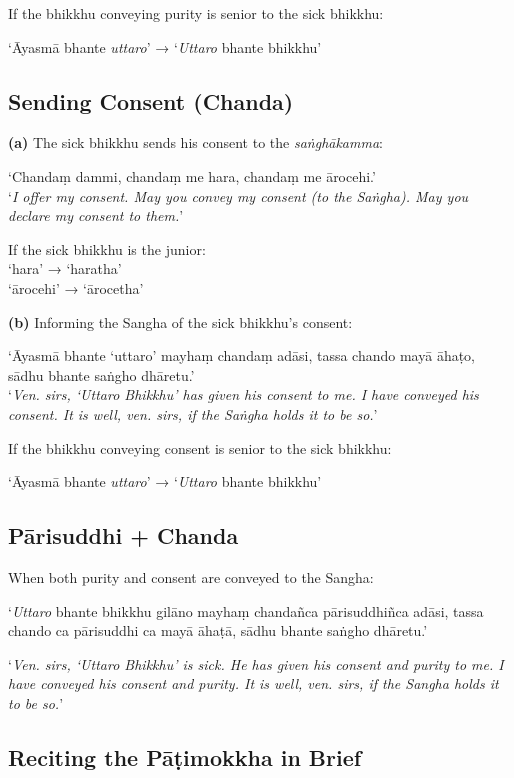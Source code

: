 If the bhikkhu conveying purity is senior to the sick bhikkhu:

‘Āyasmā bhante \emph{uttaro}’ → ‘\emph{Uttaro} bhante bhikkhu’

\subsection{Sending Consent (Chanda)}

\textbf{(a)} The sick bhikkhu sends his consent to the \emph{saṅghākamma}:

‘Chandaṃ dammi, chandaṃ me hara, chandaṃ me ārocehi.’\\
‘\emph{I offer my consent. May you convey my consent (to the Saṅgha). May you
  declare my consent to them.}’

If the sick bhikkhu is the junior:\\
‘hara’ → ‘haratha’\\
‘ārocehi’ → ‘ārocetha’

\textbf{(b)} Informing the Sangha of the sick bhikkhu's consent:

‘Āyasmā bhante ‘uttaro’ mayhaṃ chandaṃ adāsi, tassa chando mayā āhaṭo, sādhu bhante saṅgho dhāretu.’\\
‘\emph{Ven. sirs, ‘Uttaro Bhikkhu’ has given his consent to me. I have conveyed
  his consent. It is well, ven. sirs, if the Saṅgha holds it to be so.}’

If the bhikkhu conveying consent is senior to the sick bhikkhu:

‘Āyasmā bhante \emph{uttaro}’ → ‘\emph{Uttaro} bhante bhikkhu’

\subsection{Pārisuddhi + Chanda}

When both purity and consent are conveyed to the Sangha:

‘\emph{Uttaro} bhante bhikkhu gilāno mayhaṃ chandañca pārisuddhiñca adāsi, tassa
chando ca pārisuddhi ca mayā āhaṭā, sādhu bhante saṅgho dhāretu.’

‘\emph{Ven. sirs, ‘Uttaro Bhikkhu’ is sick. He has given his consent and purity
  to me. I have conveyed his consent and purity. It is well, ven. sirs, if the
  Sangha holds it to be so.}’

\clearpage

\subsection{Reciting the Pāṭimokkha in Brief}

